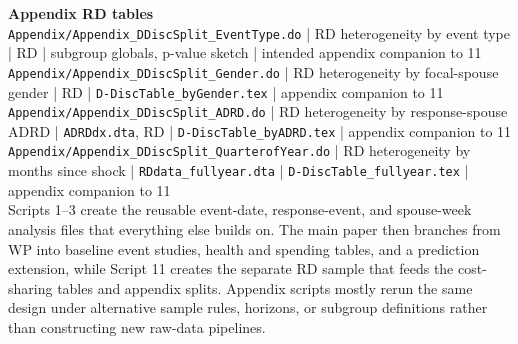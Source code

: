 \documentclass[11pt]{article}
\begin{document}
{\smallskip
\textbf{Appendix RD tables}\\
\nolinkurl{Appendix/Appendix_DDiscSplit_EventType.do} | RD heterogeneity by event type | RD | subgroup globals, p-value sketch | intended appendix companion to 11\\
\nolinkurl{Appendix/Appendix_DDiscSplit_Gender.do} | RD heterogeneity by focal-spouse gender | RD | \nolinkurl{D-DiscTable_byGender.tex} | appendix companion to 11\\
\nolinkurl{Appendix/Appendix_DDiscSplit_ADRD.do} | RD heterogeneity by response-spouse ADRD | \nolinkurl{ADRDdx.dta}, RD | \nolinkurl{D-DiscTable_byADRD.tex} | appendix companion to 11\\
\nolinkurl{Appendix/Appendix_DDiscSplit_QuarterofYear.do} | RD heterogeneity by months since shock | \nolinkurl{RDdata_fullyear.dta} | \nolinkurl{D-DiscTable_fullyear.tex} | appendix companion to 11\\

\smallskip
Scripts 1--3 create the reusable event-date, response-event, and spouse-week analysis files that everything else builds on. The main paper then branches from WP into baseline event studies, health and spending tables, and a prediction extension, while Script 11 creates the separate RD sample that feeds the cost-sharing tables and appendix splits. Appendix scripts mostly rerun the same design under alternative sample rules, horizons, or subgroup definitions rather than constructing new raw-data pipelines.
}
\end{document}
